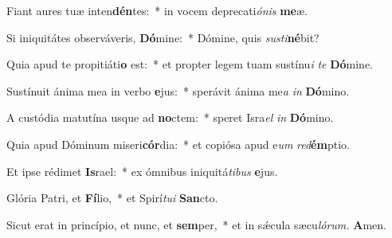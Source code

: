 \item Fiant aures tuæ inten\textbf{dén}tes:~* in vocem deprecati\teenyhspace\textit{ónis} \textbf{me}æ.
\item Si iniquitátes observáveris, \textbf{Dó}mine:~* Dómine, quis \textit{susti}\hspace{-0.01em}\textbf{né}bit?
\item Quia apud te propitiáti\textbf{o} est:~* et propter legem tuam sustínu\tinyhspace\textit{i} \textit{te} \textbf{Dó}mine.
\item Sustínuit ánima mea in verbo \textbf{e}jus:~* sperávit ánima me\tinyhspace\textit{a} \textit{in} \textbf{Dó}mino.
\item A custódia matutína usque ad \textbf{no}ctem:~* speret Isra\tinyhspace\textit{el} \textit{in} \textbf{Dó}mino.
\item Quia apud Dóminum miseri\textbf{cór}dia:~* et copiósa apud e\tinyhspace\textit{um} \textit{red}\textbf{ém}ptio.
\item Et ipse rédimet \textbf{Is}rael:~* ex ómnibus iniquitá\tinyhspace\textit{tibus} \textbf{e}jus.
\item Glória Patri, et \textbf{Fí}lio,~* et Spirí\tinyhspace\textit{tui} \textbf{San}cto.
\item Sicut erat in princípio, et nunc, et \textbf{sem}per,~* et in sǽcula sæcu\tinyhspace\textit{lórum.} \textbf{A}men.
